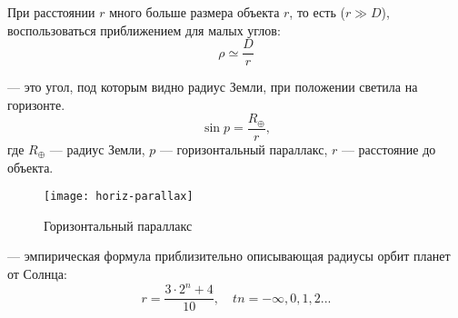 При расстоянии $r$ много больше размера объекта $r$, то есть ($r\gg D$),
  воспользоваться приближением для малых углов: \begin{equation}
\rho \simeq \frac{D}{r}
\end{equation}

 --- это угол, под которым видно радиус Земли, при положении светила на горизонте.
\begin{equation}
\sin p=\frac{R_\oplus}{r},
\end{equation}
где $R_\oplus$ --- радиус Земли, $p$ --- горизонтальный параллакс, $r$ --- расстояние до объекта.\\

\begin{figure}[h!]
\centering
\texttt{[image: horiz-parallax]}
\caption{Горизонтальный параллакс}
\end{figure}

 --- эмпирическая формула приблизительно описывающая радиусы орбит планет от Солнца:
\begin{equation}r=\frac{3\cdot 2^n+4}{10}, \quad tn=-\infty, 0, 1, 2...
\end{equation}

